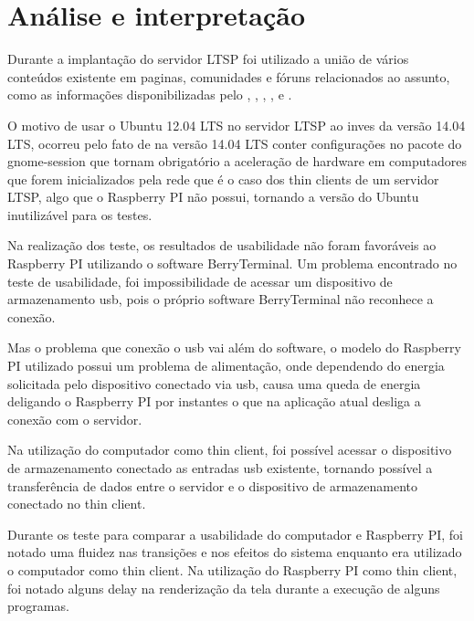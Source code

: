 \documentclass[
	12pt,				%
	openright,			%
	twoside,			%
	a4paper,			%
	chapter=TITLE,		%
	english,			%
	brazil				%
	]{abntex2}
\begin{document}

\part{Análise e interpretação}

Durante a implantação do servidor LTSP foi utilizado a união de vários conteúdos existente em paginas, comunidades e fóruns relacionados ao assunto, como as informações disponibilizadas pelo , , , ,  e .

O motivo de usar o Ubuntu 12.04 LTS no servidor LTSP ao inves da versão 14.04 LTS, ocorreu pelo fato de na versão 14.04 LTS conter configurações no pacote do gnome-session que tornam obrigatório a aceleração de hardware em computadores que forem inicializados pela rede que é o caso dos thin clients de um servidor LTSP, algo que o Raspberry PI não possui, tornando a versão do Ubuntu inutilizável para os testes.

Na realização dos teste, os resultados de usabilidade não foram favoráveis ao Raspberry PI utilizando o software BerryTerminal. Um problema encontrado no teste de usabilidade, foi impossibilidade de acessar um dispositivo de armazenamento usb, pois o próprio software BerryTerminal não reconhece a conexão.

Mas o problema que conexão o usb vai além do software, o modelo do Raspberry PI utilizado possui um problema de alimentação, onde dependendo do energia solicitada pelo dispositivo conectado via usb, causa uma queda de energia deligando o Raspberry PI por instantes o que na aplicação atual desliga a conexão com o servidor.

Na utilização do computador como thin client, foi possível acessar o dispositivo de armazenamento conectado as entradas usb existente, tornando possível  a transferência de dados entre o servidor e o dispositivo de armazenamento conectado no thin client.

Durante os teste para comparar a usabilidade do computador e Raspberry PI, foi notado uma fluidez nas transições e nos efeitos do sistema enquanto era utilizado o computador como thin client.  Na utilização do Raspberry PI como thin client,  foi notado alguns delay na renderização da tela durante a execução de alguns programas.
\end{document}
